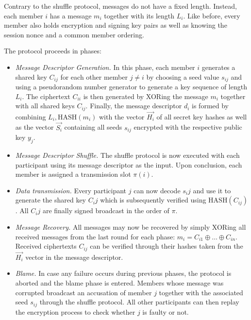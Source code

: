Contrary to the shuffle protocol, messages do not have a fixed length. Instead, each member
$i$ has a message $m_i$ together with its length $L_i$. Like before, every member also holds encryption and
signing key pairs as well as knowing the session nonce and a common member ordering.

The protocol proceeds in phases:

\begin{itemize}
\item \emph{Message Descriptor Generation.}
      In this phase, each member $i$ generates a shared key $C_{ij}$ for each other member $j \neq i$
      by choosing a seed value $s_{ij}$ and using a pseudorandom number generator \cite{stinson2006cryptography} to generate a
      key sequence of length $L_i$. The ciphertext $C_{ii}$ is then generated by
      XORing the message $m_i$ together with all shared keys $C_{ij}$. Finally, the message descriptor
      $d_i$ is formed by combining $L_i, \text{HASH}(m_i)$ with the vector $\vec{H_i}$ of all secret key
      hashes as well as the vector $\vec{S_i}$ containing all seeds $s_{ij}$ encrypted with the respective
      public key $y_j$.
\item \emph{Message Descriptor Shuffle.}
      The shuffle protocol is now executed with each participant using its message descriptor
      as the input. Upon conclusion, each member is assigned a transmission slot $\pi(i)$.
\item \emph{Data transmission.}
      Every participant $j$ can now decode $s_ij$ and use it to generate the shared key $C_ij$ which
      is subsequently verified using $\text{HASH}(C_{ij})$. All $C_ij$ are finally signed broadcast in the order
      of $\pi$.
\item \emph{Message Recovery.}
      All messages may now be recovered by simply XORing all received messages from the last round for each phase: $m_i = C_{i1} \oplus \ldots \oplus C_{in}$. Received ciphertexts $C_{ij}$ can be verified
      through their hashes taken from the $\vec{H_i}$ vector in the message descriptor.
\item \emph{Blame.}
      In case any failure occurs during previous phases, the protocol is aborted and the blame phase is entered.
      Members whose message was corrupted broadcast an accusation of member $j$ together with the
      associated seed $s_{ij}$ through the shuffle protocol.
      All other participants can then replay the encryption process to check whether $j$
      is faulty or not.
\end{itemize}

